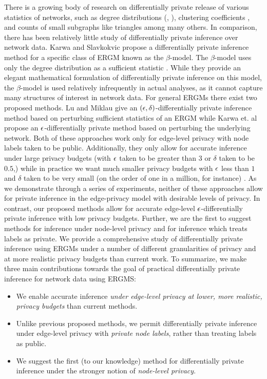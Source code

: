 There is a growing body of research on differentially private release of various statistics of networks, such as degree distributions (\cite{HLMJ09}, \cite{WNM16}), clustering coefficients \cite{WWZX12}, and counts of small subgraphs like triangles \cite{KRSY14} among many others. In comparison, there has been relatively little study of differentially private inference over network data. Karwa and Slavkokvic propose a differentially private inference method for a specific class of ERGM known as the $\beta$-model. The $\beta$-model uses only the degree distribution as a sufficient statistic \cite{KS16}. While they provide an elegant mathematical formulation of differentially private inference on this model, the $\beta$-model is used relatively infrequently in actual analyses, as it cannot capture many structures of interest in network data. For general ERGMs there exist two proposed methods. Lu and Miklau \cite{LM14} give an $(\epsilon, \delta)$-differentially private inference method based on perturbing sufficient statistics of an ERGM while Karwa et. al \cite{KKS17} propose an $\epsilon$-differentially private method based on perturbing the underlying network. Both of these approaches work only for edge-level privacy with node labels taken to be public. Additionally, they only allow for accurate inference under large privacy budgets (with $\epsilon$ taken to be greater than $3$ or $\delta$ taken to be $0.5$,) while in practice we want much smaller privacy budgets with $\epsilon$ less than $1$ and $\delta$ taken to be very small (on the order of one in a million, for instance) \cite{N17}. As we demonstrate through a series of experiments, neither of these approaches allow for private inference in the edge-privacy model with desirable levels of privacy. In contrast, our proposed methods allow for accurate edge-level $\epsilon$-differentially private inference with low privacy budgets. Further, we are the first to suggest methods for inference under node-level privacy and for inference which treats labels as private. We provide a comprehensive study of differentially private inference using ERGMs under a number of different granularities of privacy and at more realistic privacy budgets than current work. To summarize, we make three main contributions towards the goal of practical differentially private inference for network data using ERGMS:
\begin{itemize}
	\item We enable accurate inference \emph{under edge-level privacy at lower, more realistic, privacy budgets} than current methods.
	\item Unlike previous proposed methods, we permit differentially private inference under edge-level privacy with \emph{private node labels}, rather than treating labels as public.
	\item We suggest the first (to our knowledge) method for differentially private inference under the stronger notion of \emph{node-level privacy}.
\end{itemize}

